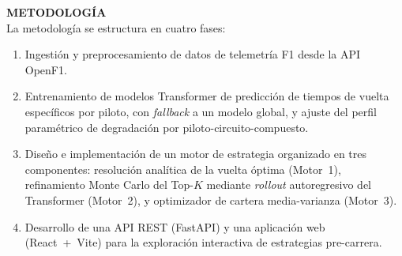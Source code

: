 \documentclass[12pt, a4paper]{book}
\begin{document}
\noindent \textbf{METODOLOGÍA}\\
La metodología se estructura en cuatro fases:
\begin{enumerate}
    \item Ingestión y preprocesamiento de datos de telemetría F1 desde la API OpenF1.
    \item Entrenamiento de modelos Transformer de predicción de tiempos de vuelta específicos por piloto, con \textit{fallback} a un modelo global, y ajuste del perfil paramétrico de degradación por piloto-circuito-compuesto.
    \item Diseño e implementación de un motor de estrategia organizado en tres componentes: resolución analítica de la vuelta óptima (Motor~1), refinamiento Monte Carlo del Top-$K$ mediante \textit{rollout} autoregresivo del Transformer (Motor~2), y optimizador de cartera media-varianza (Motor~3).
    \item Desarrollo de una API REST (FastAPI) y una aplicación web (React~+~Vite) para la exploración interactiva de estrategias pre-carrera.
\end{enumerate}
\vspace{1em}
\end{document}
